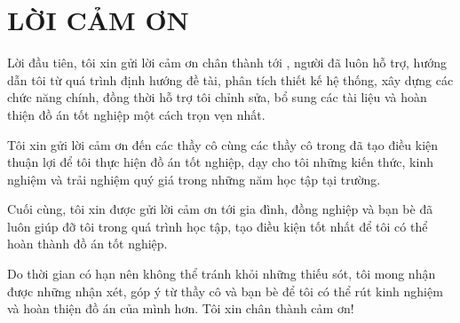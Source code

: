 \chapter*{LỜI CẢM ƠN}

Lời đầu tiên, tôi xin gửi lời cảm ơn chân thành tới \advisorName, người đã luôn hỗ trợ,
hướng dẫn tôi từ quá trình định hướng đề tài, phân tích thiết kế hệ thống, xây dựng các
chức năng chính, đồng thời hỗ trợ tôi chỉnh sửa, bổ sung các tài liệu và hoàn thiện đồ án
tốt nghiệp một cách trọn vẹn nhất.

Tôi xin gửi lời cảm ơn đến các thầy cô \facultyName{} cùng các thầy cô trong \schoolName{}
đã tạo điều kiện thuận lợi để tôi thực hiện đồ án tốt nghiệp, dạy cho tôi những kiến thức,
kinh nghiệm và trải nghiệm quý giá trong những năm học tập tại trường.

Cuối cùng, tôi xin được gửi lời cảm ơn tới gia đình, đồng nghiệp và bạn bè đã luôn giúp đỡ
tôi trong quá trình học tập, tạo điều kiện tốt nhất để tôi có thể hoàn thành đồ án tốt nghiệp.

Do thời gian có hạn nên không thể tránh khỏi những thiếu sót, tôi mong nhận được những nhận
xét, góp ý từ thầy cô và bạn bè để tôi có thể rút kinh nghiệm và hoàn thiện đồ án của mình
hơn. Tôi xin chân thành cảm ơn!
